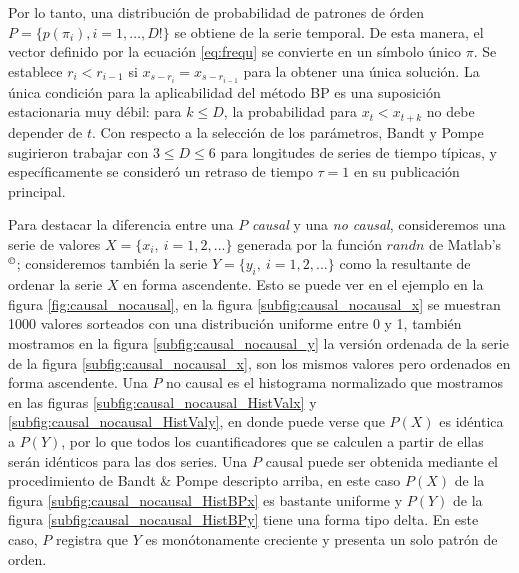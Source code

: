 Por lo tanto, una distribución de probabilidad de patrones de órden $P = \{ p(\pi_i), i = 1, \dots, D! \}$ se obtiene de la serie temporal.
De esta manera, el vector definido por la ecuación \eqref{eq:frequ} se convierte en un símbolo único $\pi$.
Se establece $r_i < r_{i-1}$ si $x_{s-r_{i}} = x_{s-r_{i-1}}$ para la obtener una única solución.
La única condición para la aplicabilidad del método BP es una suposición estacionaria muy débil: para $k \leq D$, la probabilidad para $x_t<x_{t + k}$ no debe depender de $t$.
Con respecto a la selección de los parámetros, Bandt y Pompe sugirieron trabajar con $3 \leq D \leq 6$ para longitudes de series de tiempo típicas, y específicamente se consideró un retraso de tiempo $\tau = 1$ en su publicación principal.

Para destacar la diferencia entre una $P$ \textit{causal} y una \textit{no causal}, consideremos una serie de valores $X=\{x_i,~i=1,2,...\}$ generada por la función $randn$ de Matlab's $^\copyright$; consideremos también la serie $Y=\{y_i,~i=1,2,...\}$ como la resultante de ordenar la serie $X$ en forma ascendente. Esto se puede ver en el ejemplo en la figura \ref{fig:causal_nocausal}, en la figura \ref{subfig:causal_nocausal_x} se muestran 1000 valores sorteados con una distribución uniforme entre 0 y 1, también mostramos en la figura \ref{subfig:causal_nocausal_y} la versión ordenada de la serie de la figura \ref{subfig:causal_nocausal_x}, son los mismos valores pero ordenados en forma ascendente. Una $P$ no causal es el histograma normalizado que mostramos en las figuras \ref{subfig:causal_nocausal_HistValx} y \ref{subfig:causal_nocausal_HistValy}, en donde puede verse que $P(X)$ es idéntica a $P(Y)$, por lo que todos los cuantificadores que se calculen a partir de ellas serán idénticos para las dos series. Una $P$ causal puede ser obtenida mediante el procedimiento de Bandt \& Pompe descripto arriba, en este caso $P(X)$ de la figura \ref{subfig:causal_nocausal_HistBPx} es bastante uniforme y $P(Y)$ de la figura \ref{subfig:causal_nocausal_HistBPy} tiene una forma tipo delta. En este caso, $P$ registra que $Y$ es monótonamente creciente y presenta un solo patrón de orden.

